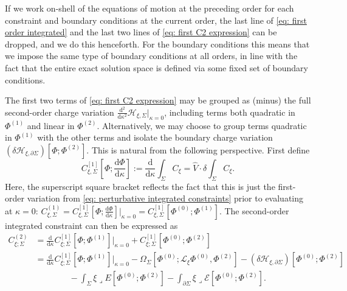 \documentclass[]{jkpaper}
\theoremstyle{plain}
\theoremstyle{definition}
\newcommand{\sins}{\mathop{\lrcorner}}
\newcommand{\fins}{\cdot}
\newcommand{\sd}{\mathrm {d}}
\newcommand{\fd}{\delta}
\newcommand{\sL}{\mathcal{L}}
\begin{document}
If we work on-shell of the equations of motion at the preceding  order for each constraint and boundary conditions at the current order, the last line of \eqref{eq: first order integrated} and the last two lines of \eqref{eq: first C2 expression} can be dropped, and we do this henceforth. For the boundary conditions this means that we impose the same type of boundary conditions at all orders, in line with the fact that the entire exact solution space is defined via some fixed set of boundary conditions.

The first two terms of \eqref{eq: first C2 expression} may be grouped as (minus) the full second-order charge variation $\frac{\sd^2}{\sd\kappa^2}\mathcal{H}_{\xi,\Sigma}\big|_{\kappa=0}$, including terms both quadratic in $\Phi^{(1)}$ and linear in $\Phi^{(2)}$. Alternatively, we may choose to group terms quadratic in $\Phi^{(1)}$ with the other terms and isolate the boundary charge variation $(\delta\mathcal{H}_{\xi,\partial\Sigma})\left[\Phi;\Phi^{(2)}\right]$.  This is natural from the following perspective. First define
\begin{equation}\label{eq: C^[1]}
    C^{[1]}_{\xi,\Sigma}\left[\Phi;\frac{\sd\Phi}{\sd\kappa}\right]:=\frac{\sd}{\sd\kappa}\int_\Sigma C_\xi=\hat{V}\fins \fd\int_\Sigma C_\xi.
\end{equation}
Here, the superscript square bracket reflects the fact that this is just the first-order variation from \eqref{eq: perturbative integrated constraints} prior to evaluating at $\kappa=0$: $C^{(1)}_{\xi,\Sigma}=C^{[1]}_{\xi,\Sigma}\left[\Phi;\frac{\sd\Phi}{\sd\kappa}\right]\big|_{\kappa=0}=C^{[1]}_{\xi,\Sigma}\left[\Phi^{(0)};\Phi^{(1)}\right]$. The second-order integrated constraint can then be expressed as
\begin{equation}\begin{split}\label{eq: alternate C2 expression}
    C^{(2)}_{\xi;\Sigma}&=\frac{\sd}{\sd\kappa}C^{[1]}_{\xi;\Sigma}\left[\Phi;\Phi^{(1)}\right]\big|_{\kappa=0}+
    C^{[1]}_{\xi;\Sigma}\left[\Phi^{(0)};\Phi^{(2)}\right]\\
    &=\frac{\sd}{\sd\kappa}C^{[1]}_{\xi;\Sigma}\left[\Phi;\Phi^{(1)}\right]\big|_{\kappa=0}
    -\Omega_{\Sigma}\left[\Phi^{(0)};\sL_\xi\Phi^{(0)},\Phi^{(2)}\right]-(\delta\mathcal{H}_{\xi,\partial\Sigma})\left[\Phi^{(0)};\Phi^{(2)}\right]\\
    &\qquad\qquad-\int_\Sigma \xi\sins E\left[\Phi^{(0)};\Phi^{(2)}\right]
    -\int_{\partial\Sigma}\xi\sins\mathcal{E}\left[\Phi^{(0)};\Phi^{(2)}\right].
\end{split}\end{equation}
\end{document}
